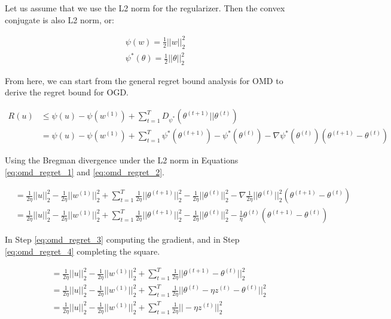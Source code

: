\documentclass[11pt]{article}
\begin{document}
Let us assume that we use the L2 norm for the regularizer. Then the convex conjugate is also L2 norm, or:

\begin{align}
    \psi({w}) = \frac{1}{2} ||w||_2^2 \\
    \psi^*({\theta}) = \frac{1}{2} ||\theta||_2^2
\end{align}

From here, we can start from the general regret bound analysis for OMD to derive the regret bound for OGD.

\begin{align}
    R(u) &\leq \psi(u) - \psi(w^{(1)}) + \sum_{t=1}^T D_{\psi^*} (\theta^{(t+1)} || \theta^{(t)}) \label{eq:omd_regret_1} \\
    &= \psi(u) - \psi(w^{(1)}) + \sum_{t=1}^T \psi^* (\theta^{(t+1)}) - \psi^*(\theta^{(t)}) - \nabla \psi^* (\theta^{(t)})(\theta^{(t+1)} - \theta^{(t)}) \label{eq:omd_regret_2}
\end{align}

Using the Bregman divergence under the L2 norm in Equations \ref{eq:omd_regret_1} and \ref{eq:omd_regret_2}.

\begin{align}
    &= \frac{1}{2\eta}||u||_2^2 - \frac{1}{2\eta}||w^{(1)}||_2^2 + \sum_{t=1}^T \frac{1}{2\eta}||\theta^{(t+1)}||_2^2 - \frac{1}{2\eta}||\theta^{(t)}||_2^2 - \nabla \frac{1}{2\eta}||\theta^{(t)}||_2^2 (\theta^{(t+1)} - \theta^{(t)}) \label{eq:omd_regret_3} \\
    &= \frac{1}{2\eta}||u||_2^2 - \frac{1}{2\eta}||w^{(1)}||_2^2 + \sum_{t=1}^T \frac{1}{2\eta}||\theta^{(t+1)}||_2^2 - \frac{1}{2\eta}||\theta^{(t)}||_2^2 - \frac{1}{\eta}\theta^{(t)} (\theta^{(t+1)} - \theta^{(t)}) \label{eq:omd_regret_4}
\end{align}

In Step \ref{eq:omd_regret_3} computing the gradient, and in Step \ref{eq:omd_regret_4} completing the square.

\begin{align}
    &= \frac{1}{2\eta}||u||_2^2 - \frac{1}{2\eta}||w^{(1)}||_2^2 + \sum_{t=1}^T \frac{1}{2\eta}||\theta^{(t+1)} - \theta^{(t)}||_2^2  \label{eq:omd_regret_5} \\
    &= \frac{1}{2\eta}||u||_2^2 - \frac{1}{2\eta}||w^{(1)}||_2^2 + \sum_{t=1}^T \frac{1}{2\eta}||\theta^{(t)} - \eta z^{(t)} - \theta^{(t)}||_2^2  \label{eq:omd_regret_6} \\
    &= \frac{1}{2\eta}||u||_2^2 - \frac{1}{2\eta}||w^{(1)}||_2^2 + \sum_{t=1}^T \frac{1}{2\eta}|| -\eta z^{(t)} ||_2^2  \label{eq:omd_regret_7}
\end{align}
\end{document}
